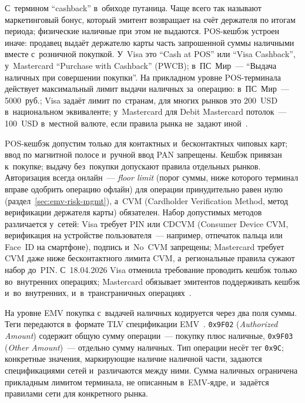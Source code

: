 С~термином \enquote{cashback} в~обиходе путаница. Чаще всего так называют
маркетинговый бонус, который эмитент возвращает на счёт держателя по итогам
периода; физические наличные при этом не выдаются. POS-кешбэк устроен иначе:
продавец выдаёт держателю карты часть запрошенной суммы наличными вместе
с~розничной покупкой. У~Visa это \enquote{Cash at POS}
или \enquote{Visa Cashback}, у~Mastercard \enquote{Purchase with Cashback}
(PWCB); в~ПС~Мир~--- \enquote{Выдача наличных при совершении покупки}. На
прикладном уровне POS-терминала действует максимальный лимит выдачи наличных
за~операцию: в~ПС~Мир~--- 5000~руб.; Visa задаёт лимит по~странам, для многих
рынков это 200~USD в~национальном эквиваленте; у~Mastercard для Debit
Mastercard потолок~--- 100~USD в~местной валюте, если правила рынка не~задают
иной~\cite{visa-core-rules,mc-tpr}.

POS-кешбэк допустим только для контактных и~бесконтактных чиповых карт; ввод по
магнитной полосе и~ручной ввод PAN запрещены. Кешбэк привязан к~покупке; выдачу без~покупки
допускают правила отдельных рынков.
Авторизация всегда онлайн~--- \textit{floor limit} (порог суммы, ниже которого
терминал вправе одобрить операцию офлайн) для операции принудительно равен нулю
(раздел~\ref{sec:emv-risk-mgmt}), а~CVM (Cardholder
Verification Method, метод верификации держателя карты) обязателен. Набор
допустимых методов различается у~сетей: Visa требует PIN или CDCVM (Consumer
  Device CVM, верификация на устройстве пользователя~--- например, отпечаток
пальца или Face~ID на смартфоне), подпись и~No~CVM запрещены; Mastercard
требует CVM даже ниже бесконтактного лимита CVM, а~региональные правила
сужают набор до~PIN. С~18.04.2026 Visa отменила требование проводить кешбэк только
во~внутренних операциях; Mastercard обязывает эмитентов
поддерживать кешбэк и~во~внутренних, и~в~трансграничных
операциях~\cite{visa-core-rules,visa-tadg,mc-tpr}.

На уровне EMV покупка с~выдачей наличных кодируется через два поля суммы. Теги
передаются в~формате TLV спецификации EMV~\cite{emvco-book3}. \texttt{0x9F02}
(\textit{Authorized Amount}) содержит общую сумму операции~--- покупку плюс
наличные, \texttt{0x9F03} (\textit{Other Amount})~--- отдельно
сумму наличных. Тип операции несёт тег \texttt{0x9C}; конкретные значения,
маркирующие наличие наличной части, задаются спецификациями сетей и~различаются
между ними. Сумма наличных ограничена прикладным лимитом терминала, не
описанным в~EMV-ядре, и~задаётся правилами сети для конкретного рынка.

